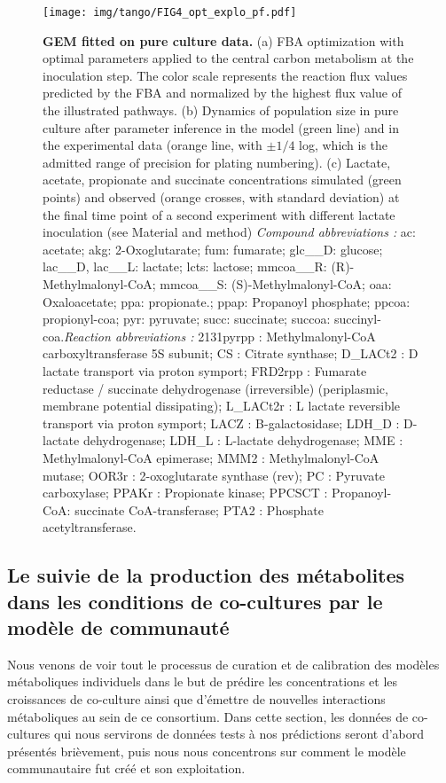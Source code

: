 \documentclass[../main.tex]{subfiles}
\begin{document}
\begin{figure}[htpb!]
    \centering
    \texttt{[image: img/tango/FIG4\_opt\_explo\_pf.pdf]}
    \caption{\textbf{\freud GEM fitted on pure culture data.} (a) FBA optimization with optimal parameters applied to the central carbon metabolism at the inoculation step. The color scale represents the reaction flux values predicted by the FBA and normalized by the highest flux value of the illustrated pathways. (b) Dynamics of \freud population size in pure culture after parameter inference in the model (green line) and in the experimental data (orange line, with $\pm 1/4$ log, which is the admitted range of precision for plating numbering). (c) Lactate, acetate, propionate and succinate concentrations simulated (green points) and observed (orange crosses, with standard deviation) at the final time point of a second experiment with different lactate inoculation (see Material and method) \textit{Compound abbreviations : } ac: acetate;  akg: 2-Oxoglutarate; fum: fumarate; glc\_\_D: glucose; lac\_\_D, lac\_\_L: lactate; lcts: lactose; mmcoa\_\_R: (R)-Methylmalonyl-CoA; mmcoa\_\_S: (S)-Methylmalonyl-CoA; oaa: Oxaloacetate; ppa: propionate.; ppap: Propanoyl phosphate; ppcoa: propionyl-coa; pyr: pyruvate; succ: succinate; succoa: succinyl-coa.\textit{Reaction abbreviations :} 2131pyrpp : Methylmalonyl-CoA carboxyltransferase 5S subunit; CS : Citrate synthase; D\_LACt2 : D lactate transport via proton symport; FRD2rpp : Fumarate reductase / succinate dehydrogenase (irreversible) (periplasmic, membrane potential dissipating); L\_LACt2r : L lactate reversible transport via proton symport; LACZ : B-galactosidase; LDH\_D : D-lactate dehydrogenase; LDH\_L : L-lactate dehydrogenase; MME : Methylmalonyl-CoA epimerase; MMM2 : Methylmalonyl-CoA mutase; OOR3r : 2-oxoglutarate synthase (rev); PC : Pyruvate carboxylase; PPAKr : Propionate kinase; PPCSCT : Propanoyl-CoA: succinate CoA-transferase; PTA2 : Phosphate acetyltransferase.
    }
    \label{dfba_metabolite_freud}
\end{figure}

\subsection{Le suivie de la production des métabolites dans les conditions de co-cultures par le modèle de communauté}

Nous venons de voir tout le processus de curation et de calibration des modèles métaboliques individuels dans le but de prédire les concentrations et les croissances de co-culture ainsi que d'émettre de nouvelles interactions métaboliques au sein de ce consortium. Dans cette section, les données de co-cultures qui nous servirons de données tests à nos prédictions seront d'abord présentés brièvement, puis nous nous concentrons sur comment le modèle communautaire fut créé et son exploitation. 
\end{document}

